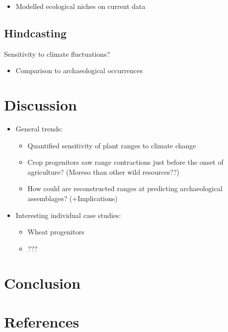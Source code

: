 \documentclass[
  number,
  review]{elsarticle}
\providecommand{\tightlist}{%
  \setlength{\itemsep}{0pt}\setlength{\parskip}{0pt}}\usepackage{longtable,booktabs,array}
\begin{document}
\begin{itemize}
\tightlist
\item
  Modelled ecological niches on current data
\end{itemize}

\subsection{Hindcasting}\label{hindcasting}

Sensitivity to climate fluctuations?

\begin{itemize}
\tightlist
\item
  Comparison to archaeological occurrences
\end{itemize}

\section{Discussion}\label{discussion}

\begin{itemize}
\tightlist
\item
  General trends:

  \begin{itemize}
  \tightlist
  \item
    Quantified sensitivity of plant ranges to climate change
  \item
    Crop progenitors saw range contractions just before the onset of
    agriculture? (Moreso than other wild resources??)
  \item
    How could are reconstructed ranges at predicting archaeological
    assemblages? (+Implications)
  \end{itemize}
\item
  Interesting individual case studies:

  \begin{itemize}
  \tightlist
  \item
    Wheat progenitors
  \item
    ???
  \end{itemize}
\end{itemize}

\section{Conclusion}\label{conclusion}

\section*{References}\label{references}
\end{document}
